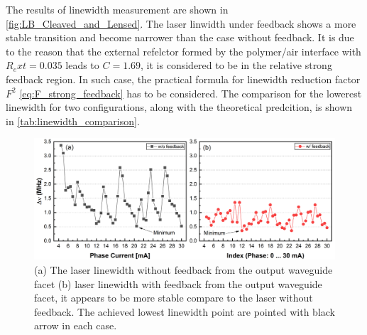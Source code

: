 The results of linewidth measurement are shown in \autoref{fig:LB_Cleaved_and_Lensed}. The laser linwidth under feedback shows a more stable transition and become narrower than the case without feedback. It is due to the reason that the external refelctor formed by the polymer/air interface with $R_ext=0.035$ leads to $C=1.69$, it is considered to be in the relative strong feedback region. In such case, the practical formula for linewidth reduction factor $F^2$ \autoref{eq:F_strong_feedback} has to be considered. The comparison for the lowerest linewidth for two configurations, along with the theoretical predcition, is shown in \autoref{tab:linewidth_comparison}.

\begin{figure}[H]
    \centering
    \includegraphics[width=\linewidth]{figures/LB_Cleaved_and_Lensed.png}
    \caption{(a) The laser linewidth without feedback from the output waveguide facet (b) laser linewidth with feedback from the output waveguide facet, it appears to be more stable compare to the laser without feedback. The achieved lowest linewidth point are pointed with black arrow in each case.}
    \label{fig:LB_Cleaved_and_Lensed}
\end{figure}


